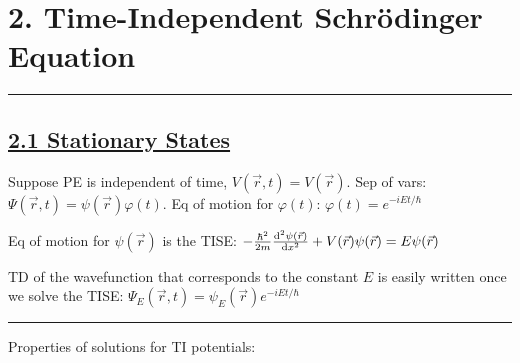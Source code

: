 \section{2. Time-Independent Schr\"{o}dinger Equation} \hrule height 0.3pt \thinspace

\subsection{\underline{2.1 Stationary States}}
Suppose PE is independent of time, $V(\vec{r}, t) = V(\vec{r})$.
Sep of vars: $\Psi(\vec{r}, t) = \psi(\vec{r}) \varphi(t)$.
Eq of motion for $\varphi(t)$: $\varphi(t) = e^{-iEt/\hbar}$

Eq of motion for $\psi(\vec{r})$ is the TISE:
$-\frac{\hbar^2 }{2m} \dv[2]{\psi(\vec{r})}{x} + V(\vec{r}) \psi(\vec{r}) = E \psi(\vec{r}) $

TD of the wavefunction that corresponds to the constant $E$ is easily written once we solve the TISE: $\Psi_{E}(\vec{r}, t) = \psi_{E}(\vec{r}) e^{-iEt / \hbar}$

\hrule height 0.06pt

Properties of solutions for TI potentials:

\vspace{-10pt}

